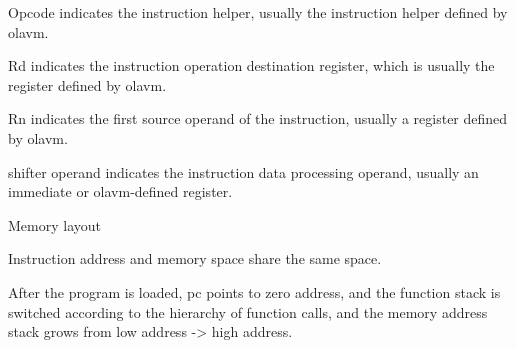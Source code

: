 \begin{itemize}
Opcode indicates the instruction helper, usually the instruction helper defined by olavm.\par
Rd indicates the instruction operation destination register, which is usually the register defined by olavm.\par
Rn indicates the first source operand of the instruction, usually a register defined by olavm.\par
shifter operand indicates the instruction data processing operand, usually an immediate or olavm-defined register.

Memory layout\par
Instruction address and memory space share the same space.

After the program is loaded, pc points to zero address, and the function stack is switched according to the hierarchy of function calls, 
and the memory address stack grows from low address -> high address.
    \end{itemize}